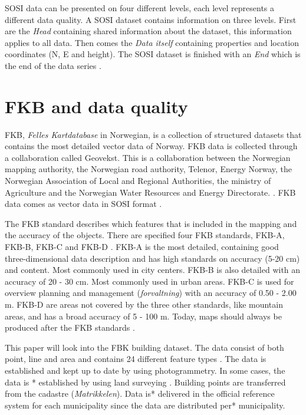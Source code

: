 SOSI data can be presented on four different levels, each level represents a different data quality. %
A SOSI dataset contains information on three levels. First are the \textit{Head} containing shared information about the dataset, this information applies to all data. Then comes the \textit{Data itself} containing properties and location coordinates (N, E and height). The SOSI dataset is finished with an \textit{End} which is the end of the data series \cite{Skogseth2014}.  

\section{FKB and data quality}

FKB, \textit{Felles Kartdatabase} in Norwegian, is a collection of structured datasets that contains the most detailed vector data of Norway. FKB data is collected through a collaboration called Geovekst. This is a collaboration between the Norwegian mapping authority, the Norwegian road authority, Telenor, Energy Norway, the Norwegian Association of Local and Regional Authorities, the ministry of Agriculture and the Norwegian Water Resources and Energy Directorate. \cite{Kartverketc}. FKB data comes as vector data in SOSI format \cite{Kartverket2011}. 

The FKB standard describes which features that is included in the mapping and the accuracy of the objects. There are specified four FKB standards, FKB-A, FKB-B, FKB-C and FKB-D \cite{Kartverket2011}. FKB-A is the most detailed, containing good three-dimensional data description and has high standards on accuracy (5-20 cm) and content. Most commonly used in city centers. FKB-B is also detailed with an accuracy of 20 - 30 cm. Most commonly used in urban areas. FKB-C is used for overview planning and management (\textit{forvaltning}) with an accuracy of 0.50 - 2.00 m. FKB-D are areas not covered by the three other standards, like mountain areas, and has a broad accuracy of 5 - 100 m. %
Today, maps should always be produced after the FKB standards \cite{Skogseth2014}.

This paper will look into the FBK building dataset. The data consist of both point, line and area and contains 24 different feature types \cite{Kartverket2013}. The data is established and kept up to date by using photogrammetry. In some cases, the data is * %
established by using land surveying \cite{Kartverket2013a}. Building points are transferred from the cadastre (\textit{Matrikkelen}). Data is* %
 delivered in the official reference system for each municipality since the data are distributed per* %
  municipality. 
  
